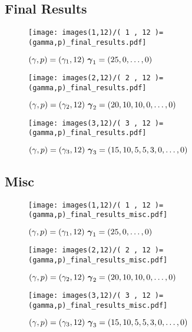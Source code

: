 \documentclass[main.tex]{subfiles}
\begin{document}

\subsection{Final Results}
\begin{figure}[H]
    \centering
    \texttt{[image: images(1,12)/( 1 , 12 )=(gamma,p)\_final\_results.pdf]}
    \caption{$(\gamma, p) = (\gamma_1, 12) \ \gammaone$}
    \label{fig:final1-12}
\end{figure}

\begin{figure}[H]
    \centering
    \texttt{[image: images(2,12)/( 2 , 12 )=(gamma,p)\_final\_results.pdf]}
    \caption{$(\gamma, p) = (\gamma_2, 12) \ \gammatwo$}
    \label{fig:final2-12}
\end{figure}

\begin{figure}[H]
    \centering
    \texttt{[image: images(3,12)/( 3 , 12 )=(gamma,p)\_final\_results.pdf]}
    \caption{$(\gamma, p) = (\gamma_3, 12) \ \gammathree$}
    \label{fig:final3-12}
\end{figure}



\subsection{Misc}
\begin{figure}[H]
    \centering
    \texttt{[image: images(1,12)/( 1 , 12 )=(gamma,p)\_final\_results\_misc.pdf]}
    \caption{$(\gamma, p) = (\gamma_1, 12) \ \gammaone$}
    \label{fig:misc1-12}
\end{figure}

\begin{figure}[H]
    \centering
    \texttt{[image: images(2,12)/( 2 , 12 )=(gamma,p)\_final\_results\_misc.pdf]}
    \caption{$(\gamma, p) = (\gamma_2, 12) \ \gammatwo$}
    \label{fig:misc2-12}
\end{figure}

\begin{figure}[H]
    \centering
    \texttt{[image: images(3,12)/( 3 , 12 )=(gamma,p)\_final\_results\_misc.pdf]}
    \caption{$(\gamma, p) = (\gamma_3, 12) \ \gammathree$}
    \label{fig:misc3-12}
\end{figure}
\end{document}
